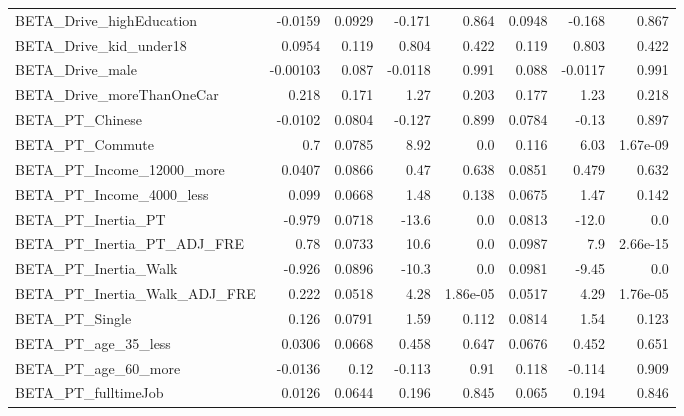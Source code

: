 \begin{tabular}{lrrrrrrr}
BETA\_Drive\_highEducation         &  -0.0159 &   0.0929 &  -0.171 &    0.864 &        0.0948 &       -0.168 &         0.867 \\
BETA\_Drive\_kid\_under18           &   0.0954 &    0.119 &   0.804 &    0.422 &         0.119 &        0.803 &         0.422 \\
BETA\_Drive\_male                  & -0.00103 &    0.087 & -0.0118 &    0.991 &         0.088 &      -0.0117 &         0.991 \\
BETA\_Drive\_moreThanOneCar        &    0.218 &    0.171 &    1.27 &    0.203 &         0.177 &         1.23 &         0.218 \\
BETA\_PT\_Chinese                  &  -0.0102 &   0.0804 &  -0.127 &    0.899 &        0.0784 &        -0.13 &         0.897 \\
BETA\_PT\_Commute                  &      0.7 &   0.0785 &    8.92 &      0.0 &         0.116 &         6.03 &      1.67e-09 \\
BETA\_PT\_Income\_12000\_more        &   0.0407 &   0.0866 &    0.47 &    0.638 &        0.0851 &        0.479 &         0.632 \\
BETA\_PT\_Income\_4000\_less         &    0.099 &   0.0668 &    1.48 &    0.138 &        0.0675 &         1.47 &         0.142 \\
BETA\_PT\_Inertia\_PT               &   -0.979 &   0.0718 &   -13.6 &      0.0 &        0.0813 &        -12.0 &           0.0 \\
BETA\_PT\_Inertia\_PT\_ADJ\_FRE       &     0.78 &   0.0733 &    10.6 &      0.0 &        0.0987 &          7.9 &      2.66e-15 \\
BETA\_PT\_Inertia\_Walk             &   -0.926 &   0.0896 &   -10.3 &      0.0 &        0.0981 &        -9.45 &           0.0 \\
BETA\_PT\_Inertia\_Walk\_ADJ\_FRE     &    0.222 &   0.0518 &    4.28 & 1.86e-05 &        0.0517 &         4.29 &      1.76e-05 \\
BETA\_PT\_Single                   &    0.126 &   0.0791 &    1.59 &    0.112 &        0.0814 &         1.54 &         0.123 \\
BETA\_PT\_age\_35\_less              &   0.0306 &   0.0668 &   0.458 &    0.647 &        0.0676 &        0.452 &         0.651 \\
BETA\_PT\_age\_60\_more              &  -0.0136 &     0.12 &  -0.113 &     0.91 &         0.118 &       -0.114 &         0.909 \\
BETA\_PT\_fulltimeJob              &   0.0126 &   0.0644 &   0.196 &    0.845 &         0.065 &        0.194 &         0.846 \\

\end{tabular}
